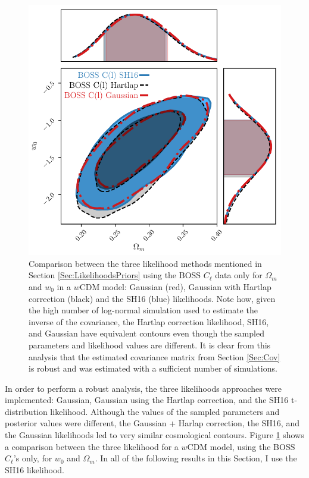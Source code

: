 \begin{figure}
\begin{center}
\includegraphics[scale=0.73]{BOSS-FIGS/likelihood_comparisonOmega_cdm_w0.pdf}
\caption[Comparison between the three likelihood methods mentioned in Section \ref{Sec:LikelihoodsPriors} using the BOSS $C_{\ell}$ data only for $\Omega_{m}$ and $w_0$.]{Comparison between the three likelihood methods mentioned in Section \ref{Sec:LikelihoodsPriors} using the BOSS $C_{\ell}$ data only for $\Omega_{m}$ and $w_0$ in a $w$CDM model: Gaussian (red), Gaussian with Hartlap correction (black) and the SH16 (blue) likelihoods. Note how, given the high number of log-normal simulation used to estimate the inverse of the covariance, the Hartlap correction likelihood, SH16, and Gaussian have equivalent contours even though the sampled parameters and likelihood values are different. It is clear from this analysis that the estimated covariance matrix from Section \ref{Sec:Cov} is robust and was estimated with a sufficient number of simulations.}
\label{fig:LikelihoodCompare}
\end{center}
\end{figure}

\qquad In order to perform a robust analysis, the three likelihoods approaches were implemented: Gaussian, Gaussian using the Hartlap correction, and the SH16 t-distribution likelihood. Although the values of the sampled parameters and posterior values were different, the Gaussian + Harlap correction, the SH16, and the Gaussian likelihoods led to very similar cosmological contours. Figure \ref{fig:LikelihoodCompare} shows a comparison between the three likelihood for a $w$CDM
model, using the BOSS $C_{\ell}$'s only, for $w_0$ and $\Omega_m$. In all of the following results in this Section, I use the SH16 likelihood.



